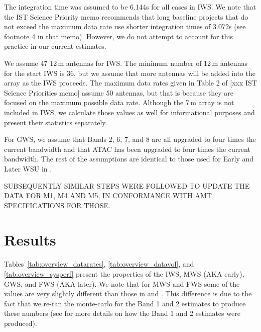 \documentclass[preprint]{aastex631}
\begin{document}
The integration time was assumed to be 6.144s for all cases in IWS. We note that the IST Science Priority memo recommends that long baseline projects that do not exceed the maximum data rate use shorter integration times of 3.072s (see footnote 4 in that memo). However, we do not attempt to account for this practice in our current estimates.

We assume 47 12\,m antennas for IWS. The minimum number of 12\,m antennas for the start IWS is 36, but we assume that more antennas will be added into the array as the IWS proceeds. The maximum data rates given in Table 2 of [xxx IST Science Priorities memo] assume 50 antennas, but that is because they are focused on the maximum possible data rate. Although the 7\,m array is not included in IWS, we calculate those values as well for informational purposes and present their statistics separately.

For GWS, we assume that Bands 2, 6, 7, and 8 are all upgraded to four times the current bandwidth and that ATAC has been upgraded to four times the current bandwidth. The rest of the assumptions are identical to those used for Early and Later WSU in \citet{Kepley2024DataProperties}.

SUBSEQUENTLY SIMILAR STEPS WERE FOLLOWED TO UPDATE THE DATA FOR M1, M4 AND M5, IN CONFORMANCE WITH AMT SPECIFICATIONS FOR THOSE.

\section{Results} \label{sec:results}

Tables~\ref{tab:overview_datarates}, \ref{tab:overview_datavol}, and \ref{tab:overview_sysperf} present the properties of the IWS, MWS (AKA early), GWS, and FWS (AKA later). We note that for MWS and FWS some of the values are very slightly different than those in \citet{Kepley2024DataProperties} and \citet{Kepley2024DataEstimate}. This difference is due to the fact that we re-ran the monte-carlo for the Band 1 and 2 estimates to produce these numbers (see \citet{Kepley2024DataProperties} for more details on how the Band 1 and 2 estimates were produced).





\end{document}
